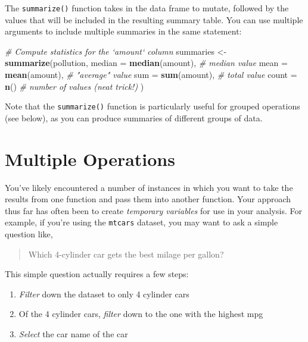 \documentclass[]{book}
\newenvironment{Shaded}{\begin{snugshade}}{\end{snugshade}}
\newcommand{\KeywordTok}[1]{\textcolor[rgb]{0.13,0.29,0.53}{\textbf{#1}}}
\newcommand{\DataTypeTok}[1]{\textcolor[rgb]{0.13,0.29,0.53}{#1}}
\newcommand{\StringTok}[1]{\textcolor[rgb]{0.31,0.60,0.02}{#1}}
\newcommand{\CommentTok}[1]{\textcolor[rgb]{0.56,0.35,0.01}{\textit{#1}}}
\newcommand{\NormalTok}[1]{#1}
\providecommand{\tightlist}{%
  \setlength{\itemsep}{0pt}\setlength{\parskip}{0pt}}
\theoremstyle{definition}
\theoremstyle{definition}
\theoremstyle{remark}
\begin{document}
The \texttt{summarize()} function takes in the data frame to mutate,
followed by the values that will be included in the resulting summary
table. You can use multiple arguments to include multiple summaries in
the same statement:

\begin{Shaded}
\begin{Highlighting}[]
\CommentTok{# Compute statistics for the `amount` column}
\NormalTok{summaries <-}\StringTok{ }\KeywordTok{summarize}\NormalTok{(pollution,}
                       \DataTypeTok{median =} \KeywordTok{median}\NormalTok{(amount),  }\CommentTok{# median value}
                       \DataTypeTok{mean =} \KeywordTok{mean}\NormalTok{(amount),      }\CommentTok{# "average" value}
                       \DataTypeTok{sum =} \KeywordTok{sum}\NormalTok{(amount),        }\CommentTok{# total value}
                       \DataTypeTok{count =} \KeywordTok{n}\NormalTok{()               }\CommentTok{# number of values (neat trick!)}
\NormalTok{                       )}
\end{Highlighting}
\end{Shaded}

Note that the \texttt{summarize()} function is particularly useful for
grouped operations (see below), as you can produce summaries of
different groups of data.

\section{Multiple Operations}\label{multiple-operations}

You've likely encountered a number of instances in which you want to
take the results from one function and pass them into another function.
Your approach thus far has often been to create \emph{temporary
variables} for use in your analysis. For example, if you're using the
\texttt{mtcars} dataset, you may want to ask a simple question like,

\begin{quote}
Which 4-cylinder car gets the best milage per gallon?
\end{quote}

This simple question actually requires a few steps:

\begin{enumerate}
\def\labelenumi{\arabic{enumi}.}
\tightlist
\item
  \emph{Filter} down the dataset to only 4 cylinder cars
\item
  Of the 4 cylinder cars, \emph{filter} down to the one with the highest
  mpg
\item
  \emph{Select} the car name of the car
\end{enumerate}
\end{document}

